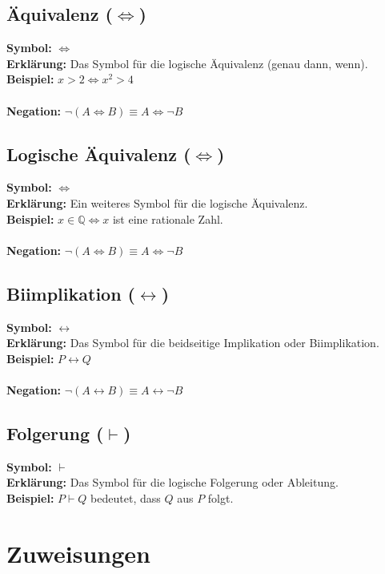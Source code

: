 \documentclass[12pt,a4paper]{article}
\begin{document}
\subsection{Äquivalenz (\texorpdfstring{$\iff$}{iff})}
\textbf{Symbol:} $\iff$ \\
\textbf{Erklärung:} Das Symbol für die logische Äquivalenz (genau dann, wenn). \\
\textbf{Beispiel:} $x > 2 \iff x^2 > 4$ \\ \\
\textbf{Negation:} $\neg (A \iff B) \equiv A \iff \neg B$

\subsection{Logische Äquivalenz (\texorpdfstring{$\Leftrightarrow$}{Leftrightarrow})}
\textbf{Symbol:} $\Leftrightarrow$ \\
\textbf{Erklärung:} Ein weiteres Symbol für die logische Äquivalenz. \\
\textbf{Beispiel:} $x \in \mathbb{Q} \Leftrightarrow x$ ist eine rationale Zahl. \\ \\
\textbf{Negation:} $\neg (A \Leftrightarrow B) \equiv A \Leftrightarrow \neg B$

\subsection{Biimplikation (\texorpdfstring{$\leftrightarrow$}{leftrightarrow})}
\textbf{Symbol:} $\leftrightarrow$ \\
\textbf{Erklärung:} Das Symbol für die beidseitige Implikation oder Biimplikation. \\
\textbf{Beispiel:} $P \leftrightarrow Q$ \\ \\
\textbf{Negation:} $\neg (A \leftrightarrow B) \equiv A \leftrightarrow \neg B$

\subsection{Folgerung (\texorpdfstring{$\vdash$}{vdash})}
\textbf{Symbol:} $\vdash$ \\
\textbf{Erklärung:} Das Symbol für die logische Folgerung oder Ableitung. \\
\textbf{Beispiel:} $P \vdash Q$ bedeutet, dass $Q$ aus $P$ folgt.
\section{Zuweisungen}
\end{document}
